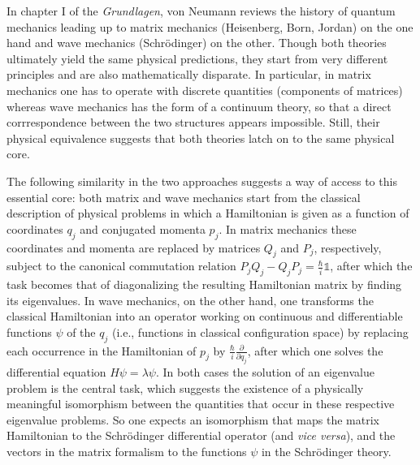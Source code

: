 \documentclass[12pt]{article}
\begin{document}
In chapter I of the \emph{Grundlagen}, von Neumann reviews the history of quantum mechanics leading up to matrix mechanics (Heisenberg, Born, Jordan) on the one hand and wave mechanics (Schr\"{o}dinger) on the other. Though both theories ultimately yield the same physical predictions, they start from very different principles and are also mathematically disparate. In particular, in matrix mechanics one has to operate with discrete quantities (components of matrices) whereas wave mechanics has the form of a continuum theory, so that a direct corrrespondence between the two structures appears impossible. Still, their physical equivalence suggests that both theories latch on to the same physical core.

The following similarity in the two approaches suggests a way of access to this essential core: both matrix and wave mechanics start from the classical description of physical problems in which a Hamiltonian is given as a function of coordinates $q_j$ and conjugated momenta $p_j$. In matrix mechanics these coordinates and momenta are replaced by matrices $Q_j$ and $P_j$, respectively, subject to the canonical commutation relation $P_j Q_j - Q_j P_j = \frac{\hbar}{i} \mathbb{1} $, after which the task becomes that of diagonalizing the resulting Hamiltonian matrix by finding its eigenvalues. In wave mechanics, on the other hand, one transforms the classical Hamiltonian into an operator working on continuous and differentiable functions $\psi$ of the $q_j$ (i.e., functions in classical configuration space) by replacing each occurrence in the Hamiltonian of $p_j$ by $\frac{\hbar}{i} \frac{\partial}{\partial q_j}$, after which one solves the differential equation $H \psi = \lambda \psi$. In both cases the solution of an eigenvalue problem is the central task, which suggests the existence of a physically meaningful isomorphism between the quantities that occur in these respective eigenvalue problems. So one expects an isomorphism that maps the matrix Hamiltonian to the Schr\"{o}dinger differential operator (and \emph{vice versa}), and the vectors in the matrix formalism to the functions $\psi$ in the Schr\"{o}dinger theory.
\end{document}
